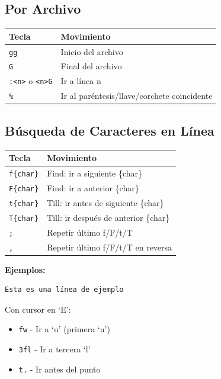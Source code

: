 \documentclass[
  doc,
  floatsintext,
  longtable,
  a4paper,
  nolmodern,
  notxfonts,
  notimes,
  12pt,
  colorlinks=true,linkcolor=blue,citecolor=blue,urlcolor=blue]{apa7}
\providecommand{\tightlist}{%
  \setlength{\itemsep}{0pt}\setlength{\parskip}{0pt}}
\newcounter{none} %
\begin{document}
\subsection{Por Archivo}\label{por-archivo}

{\def\LTcaptype{none} %
\begin{longtable}[]{@{}ll@{}}
\toprule\noalign{}
Tecla & Movimiento \\
\midrule\noalign{}
\endhead
\bottomrule\noalign{}
\endlastfoot
\texttt{gg} & Inicio del archivo \\
\texttt{G} & Final del archivo \\
\texttt{:\textless{}n\textgreater{}} o
\texttt{\textless{}n\textgreater{}G} & Ir a línea n \\
\texttt{\%} & Ir al paréntesis/llave/corchete coincidente \\
\end{longtable}
}

\subsection{Búsqueda de Caracteres en
Línea}\label{buxfasqueda-de-caracteres-en-luxednea}

{\def\LTcaptype{none} %
\begin{longtable}[]{@{}ll@{}}
\toprule\noalign{}
Tecla & Movimiento \\
\midrule\noalign{}
\endhead
\bottomrule\noalign{}
\endlastfoot
\texttt{f\{char\}} & Find: ir a siguiente \{char\} \\
\texttt{F\{char\}} & Find: ir a anterior \{char\} \\
\texttt{t\{char\}} & Till: ir antes de siguiente \{char\} \\
\texttt{T\{char\}} & Till: ir después de anterior \{char\} \\
\texttt{;} & Repetir último f/F/t/T \\
\texttt{,} & Repetir último f/F/t/T en reversa \\
\end{longtable}
}

\textbf{Ejemplos:}

\begin{verbatim}
Esta es una línea de ejemplo
\end{verbatim}

Con cursor en `E':

\begin{itemize}
\tightlist
\item
  \texttt{fw} - Ir a `u' (primera `u')
\item
  \texttt{3fl} - Ir a tercera `l'
\item
  \texttt{t.} - Ir antes del punto
\end{itemize}
\end{document}
